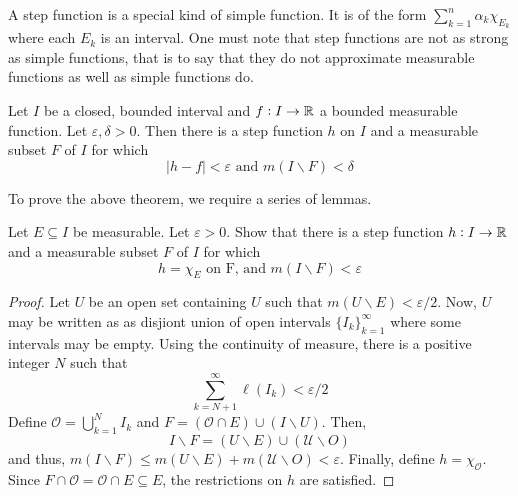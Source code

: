 A step function is a special kind of simple function. It is of the form $\sum_{k = 1}^n \alpha_k\chi_{E_k}$ where each $E_k$ is an interval. One must note that step functions are not as strong as simple functions, that is to say that they do not approximate measurable functions as well as simple functions do.

\begin{theorem}
    Let $I$ be a closed, bounded interval and $f: I\to\mathbb{R}$ a bounded measurable function. Let $\varepsilon, \delta > 0$. Then there is a step function $h$ on $I$ and a measurable subset $F$ of $I$ for which 
    \begin{equation*}
        |h - f| < \varepsilon \text{ and } m(I\backslash F) < \delta
    \end{equation*}
\end{theorem}

To prove the above theorem, we require a series of lemmas. 

\begin{lemma}
    Let $E\subseteq I$ be measurable. Let $\varepsilon > 0$. Show that there is a step function $h:I\to\mathbb{R}$ and a measurable subset $F$ of $I$ for which 
    \begin{equation*}
        h = \chi_E\text{ on F, and } m(I\backslash F) < \varepsilon
    \end{equation*}
\end{lemma}
\begin{proof}
    Let $U$ be an open set containing $U$ such that $m(U\backslash E) < \varepsilon/2$. Now, $U$ may be written as as disjiont union of open intervals $\{I_k\}_{k = 1}^\infty$ where some intervals may be empty. Using the continuity of measure, there is a positive integer $N$ such that 
    \begin{equation*}
        \sum_{k = N + 1}^\infty\ell(I_k) < \varepsilon/2
    \end{equation*}
    Define $\mathcal O = \bigcup\limits_{k = 1}^{N} I_k$ and $F = (\mathcal O\cap E)\cup(I\backslash U)$. Then, 
    \begin{equation*}
        I\backslash F = (U\backslash E)\cup(\mathcal U\backslash O)
    \end{equation*}
    and thus, $m(I\backslash F)\le m(U\backslash E) + m(\mathcal U\backslash O) < \varepsilon$. Finally, define $h = \chi_{\mathcal O}$. Since $F\cap\mathcal O = \mathcal O\cap E\subseteq E$, the restrictions on $h$ are satisfied.
\end{proof}

